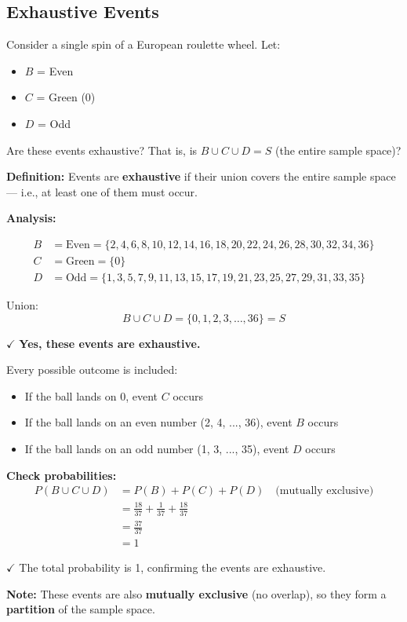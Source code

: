 \documentclass[11pt,a4paper]{article}
\begin{document}
\subsection*{Exhaustive Events}

\begin{question}
Consider a single spin of a European roulette wheel. Let:
\begin{itemize}
    \item $B$ = Even
    \item $C$ = Green (0)
    \item $D$ = Odd
\end{itemize}

Are these events exhaustive? That is, is $B \cup C \cup D = S$ (the entire sample space)?
\end{question}

\begin{answer}
\textbf{Definition:} Events are \textbf{exhaustive} if their union covers the entire sample space — i.e., at least one of them must occur.

\vspace{0.3cm}
\textbf{Analysis:}

\begin{align*}
B &= \text{Even} = \{2, 4, 6, 8, 10, 12, 14, 16, 18, 20, 22, 24, 26, 28, 30, 32, 34, 36\}\\
C &= \text{Green} = \{0\}\\
D &= \text{Odd} = \{1, 3, 5, 7, 9, 11, 13, 15, 17, 19, 21, 23, 25, 27, 29, 31, 33, 35\}
\end{align*}

Union:
\[
B \cup C \cup D = \{0, 1, 2, 3, \ldots, 36\} = S
\]

$\checkmark$ \textbf{Yes, these events are exhaustive.}

Every possible outcome is included:
\begin{itemize}
    \item If the ball lands on 0, event $C$ occurs
    \item If the ball lands on an even number (2, 4, ..., 36), event $B$ occurs
    \item If the ball lands on an odd number (1, 3, ..., 35), event $D$ occurs
\end{itemize}

\vspace{0.3cm}
\textbf{Check probabilities:}
\begin{align}
P(B \cup C \cup D) &= P(B) + P(C) + P(D) \quad \text{(mutually exclusive)}\\
&= \frac{18}{37} + \frac{1}{37} + \frac{18}{37}\\
&= \frac{37}{37}\\
&= 1
\end{align}

$\checkmark$ The total probability is 1, confirming the events are exhaustive.

\vspace{0.3cm}
\textbf{Note:} These events are also \textbf{mutually exclusive} (no overlap), so they form a \textbf{partition} of the sample space.
\end{answer}
\end{document}
